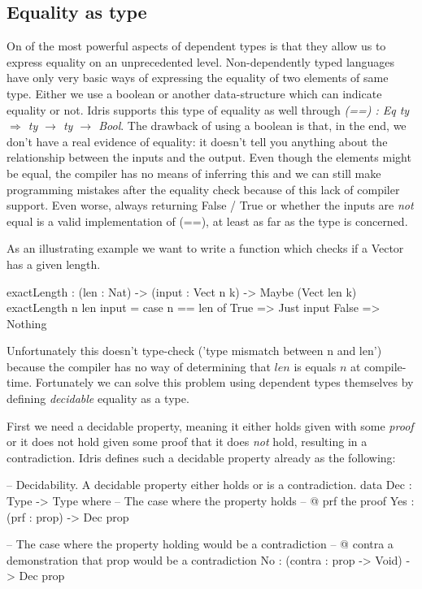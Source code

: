 \subsection{Equality as type}
\label{sub:dep_equality}
On of the most powerful aspects of dependent types is that they allow us to express equality on an unprecedented level. Non-dependently typed languages have only very basic ways of expressing the equality of two elements of same type. Either we use a boolean or another data-structure which can indicate equality or not. Idris supports this type of equality as well through \textit{(==) : Eq ty $\Rightarrow$ ty $\rightarrow$ ty $\rightarrow$ Bool}. The drawback of using a boolean is that, in the end, we don't have a real evidence of equality: it doesn't tell you anything about the relationship between the inputs and the output. Even though the elements might be equal, the compiler has no means of inferring this and we can still make programming mistakes after the equality check because of this lack of compiler support. Even worse, always returning False / True or whether the inputs are \textit{not} equal is a valid implementation of (==), at least as far as the type is concerned.

As an illustrating example we want to write a function which checks if a Vector has a given length. 

\begin{HaskellCode}
exactLength : (len : Nat) -> (input : Vect n k) -> Maybe (Vect len k)
exactLength {n} len input = case n == len of
                                 True  => Just input 
                                 False => Nothing 
\end{HaskellCode}

Unfortunately this doesn't type-check ('type mismatch between n and len') because the compiler has no way of determining that $len$ is equals $n$ at compile-time. Fortunately we can solve this problem using dependent types themselves by defining \textit{decidable} equality as a type.

First we need a decidable property, meaning it either holds given with some \textit{proof} or it does not hold given some proof that it does \textit{not} hold, resulting in a contradiction. Idris defines such a decidable property already as the following:

\begin{HaskellCode}
-- Decidability. A decidable property either holds or is a contradiction.
data Dec : Type -> Type where
  -- The case where the property holds
  -- @ prf the proof
  Yes : (prf : prop) -> Dec prop

  -- The case where the property holding would be a contradiction
  -- @ contra a demonstration that prop would be a contradiction
  No  : (contra : prop -> Void) -> Dec prop
\end{HaskellCode}

